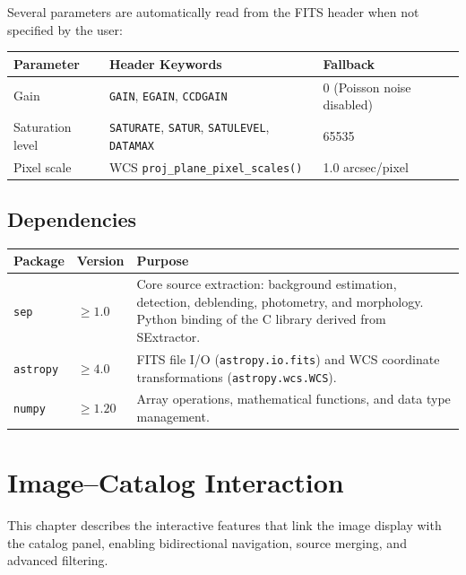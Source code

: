 \documentclass[11pt,fleqn]{book}
\begin{document}
Several parameters are automatically read from the FITS header when not specified by the user:

\begin{center}
\begin{tabular}{lll}
\toprule
\textbf{Parameter} & \textbf{Header Keywords} & \textbf{Fallback} \\
\midrule
Gain & \texttt{GAIN}, \texttt{EGAIN}, \texttt{CCDGAIN} & 0 (Poisson noise disabled) \\
Saturation level & \texttt{SATURATE}, \texttt{SATUR}, \texttt{SATULEVEL}, \texttt{DATAMAX} & 65535 \\
Pixel scale & WCS \texttt{proj\_plane\_pixel\_scales()} & 1.0 arcsec/pixel \\
\bottomrule
\end{tabular}
\end{center}

\section{Dependencies}

\begin{center}
\begin{longtable}{L{3cm} L{2.5cm} L{7cm}}
\toprule
\textbf{Package} & \textbf{Version} & \textbf{Purpose} \\
\midrule
\endhead
\texttt{sep} & $\geq 1.0$ & Core source extraction: background estimation, detection, deblending, photometry, and morphology. Python binding of the C library derived from SExtractor. \\
\midrule
\texttt{astropy} & $\geq 4.0$ & FITS file I/O (\texttt{astropy.io.fits}) and WCS coordinate transformations (\texttt{astropy.wcs.WCS}). \\
\midrule
\texttt{numpy} & $\geq 1.20$ & Array operations, mathematical functions, and data type management. \\
\bottomrule
\end{longtable}
\end{center}


\chapter{Image--Catalog Interaction}
\label{ch:interaction}

This chapter describes the interactive features that link the image display with the catalog panel, enabling bidirectional navigation, source merging, and advanced filtering.
\end{document}
